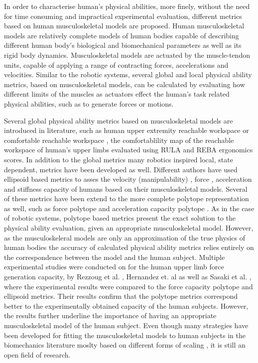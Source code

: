 In order to characterise human's physical abilities, more finely, without the need for time consuming and impractical experimental evaluation, different metrics based on human musculoskeletal models are proposed. Human musculoskeletal models are relatively complete models of human bodies capable of describing different human body's biological and biomechanical parameters as well as its rigid body dynamics. Musculoskeletal models are actuated by the muscle-tendon units, capable of applying a range of contracting forces, accelerations and velocities. Similar to the robotic systems, several global and local physical ability metrics, based on musculoskeletal models, can be calculated by evaluating how different limits of the muscles as actuators effect the human's task related physical abilities, such as to generate forces or motions. 

Several global physical ability metrics based on musculoskeletal models are introduced in literature, such as human upper extremity reachable workspace \cite{Lenarcic1994,Kurillo2013} or comfortable reachable workspace \cite{Figueredo2021}, the comfortablility map of the reachable workspace of human's upper limbs evaluated using RULA and REBA ergonomics scores. In addition to the global metrics many robotics inspired local, state dependent, metrics have been developed as well. Different authors have used ellipsoid based metrics to asses the velocity (manipulability) \cite{Rezzoug2012manipulability}, force \cite{rezzoug_application_2012, lazinica_higher_2010}, acceleration \cite{khatib2009robotics} and stiffness \cite{Artemiadis2010} capacity of humans based on their musculoskeletal models. Several of these metrics have been extend to the more complete polytope representation as well, such as force polytope \cite{sasaki2011vertex, rezzoug_application_2012, carmichael_estimating_2013} and acceleration capacity polytope \cite{khatib2009robotics, demircan2012muscle}. As in the case of robotic systems, polytope based metrics present the exact solution to the physical ability evaluation, given an appropriate musculoskeletal model. However, as the musculoskeleral models are only an approximation of the true physics of human bodies the accuracy of calculated physical ability metrics relies entirely on the correspondence between the model and the human subject. Multiple experimental studies were conducted on for the human upper limb force generation capacity, by Rezzoug et al. \cite{biomechanics1010008}, Hernandez et. al \cite{HERNANDEZ2015} as well as Sasaki et al. \cite{lazinica_higher_2010}, where the experimental results were compared to the force capacity polytope and ellipsoid metrics. Their results confirm that the polytope metrics correspond better to the experimentally obtained capacity of the human subjects. However, the results further underline the importance of having an appropriate musculoskeletal model of the human subject. Even though many strategies have been developed for fitting the musculoskeletal models to human subjects in the biomechanics literature moslty based on different forms of scaling \cite{Lund2015, Ziyun2019}, it is still an open field of research. 

